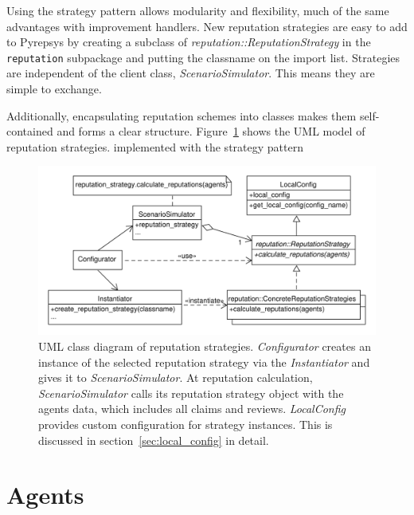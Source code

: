 \documentclass[%
    ]{\PathToTumTemplate/thesis/tum_thesis}
\begin{document}
Using the strategy pattern allows modularity and flexibility, much of the same advantages with improvement handlers.
New reputation strategies are easy to add to Pyrepsys by creating a subclass of \emph{reputation::ReputationStrategy} in the \texttt{reputation} subpackage and putting the classname on the import list.
Strategies are independent of the client class, \emph{ScenarioSimulator}.
This means they are simple to exchange.

Additionally, encapsulating reputation schemes into classes makes them self-contained and forms a clear structure.
Figure~\ref{fig:reputation_strategy} shows the UML model of reputation strategies.
implemented with the strategy pattern

\begin{figure}[tbp]
  \begin{center}
        \includegraphics[width=1\linewidth]	{../uml/reputation_strategy.pdf}
    \caption{
	UML class diagram of reputation strategies.
	\emph{Configurator} creates an instance of the selected reputation strategy via the \emph{Instantiator} and gives it to \emph{ScenarioSimulator}.
	At reputation calculation, \emph{ScenarioSimulator} calls its reputation strategy object with the agents data, which includes all claims and reviews.
	\emph{LocalConfig} provides custom configuration for strategy instances.
	This is discussed in section~\ref{sec:local_config} in detail.
    }
    \label{fig:reputation_strategy}
  \end{center}
\end{figure}



\section{Agents}\label{sec:impl_agent}
\end{document}
